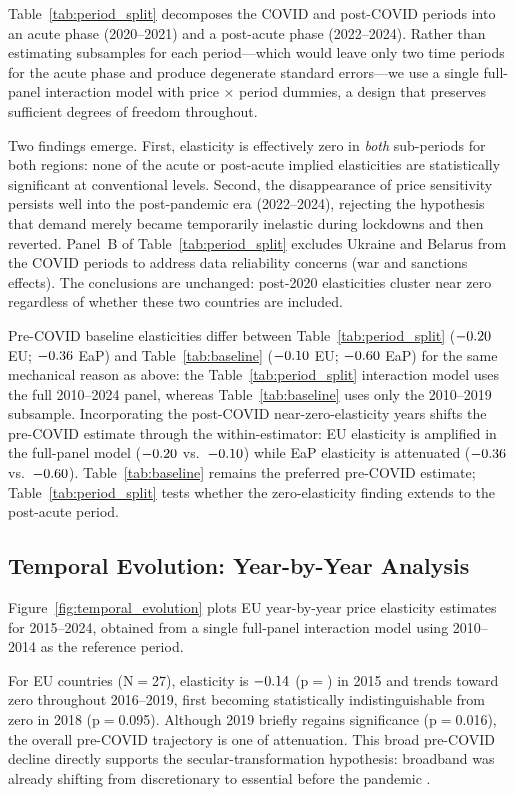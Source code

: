 Table~\ref{tab:period_split} decomposes the COVID and post-COVID periods into an acute phase
(2020--2021) and a post-acute phase (2022--2024). Rather than estimating subsamples for each
period---which would leave only two time periods for the acute phase and produce degenerate
standard errors---we use a single full-panel interaction model with price$\,\times\,$period
dummies, a design that preserves sufficient degrees of freedom throughout.

Two findings emerge. First, elasticity is effectively zero in \emph{both} sub-periods for
both regions: none of the acute or post-acute implied elasticities are statistically
significant at conventional levels. Second, the disappearance of price sensitivity persists
well into the post-pandemic era (2022--2024), rejecting the hypothesis that demand merely
became temporarily inelastic during lockdowns and then reverted. Panel~B of Table~\ref{tab:period_split} excludes Ukraine
and Belarus from the COVID periods to address data reliability concerns (war and sanctions
effects). The conclusions are unchanged: post-2020 elasticities cluster near zero regardless
of whether these two countries are included.

Pre-COVID baseline elasticities differ between Table~\ref{tab:period_split}
($-0.20$ EU; $-0.36$ EaP) and Table~\ref{tab:baseline} ($-0.10$ EU;
$-0.60$ EaP) for the same mechanical reason as above: the Table~\ref{tab:period_split}
interaction model uses the full 2010--2024 panel, whereas Table~\ref{tab:baseline} uses only
the 2010--2019 subsample. Incorporating the post-COVID near-zero-elasticity years shifts the
pre-COVID estimate through the within-estimator: EU elasticity is amplified in the full-panel
model ($-0.20$ vs.\ $-0.10$) while EaP elasticity is attenuated ($-0.36$
vs.\ $-0.60$). Table~\ref{tab:baseline} remains the preferred pre-COVID estimate;
Table~\ref{tab:period_split} tests whether the zero-elasticity finding extends to the
post-acute period.

\subsection{Temporal Evolution: Year-by-Year Analysis}

Figure~\ref{fig:temporal_evolution} plots EU year-by-year price elasticity estimates for
2015--2024, obtained from a single full-panel interaction model using 2010--2014 as the
reference period.

For EU countries (N$=$27), elasticity is $-0.14$ (p$=$\EUYbyYRefPval) in 2015 and
trends toward zero throughout 2016--2019, first becoming statistically indistinguishable
from zero in 2018 (p$=$0.095). Although 2019 briefly regains significance (p$=$0.016), the
overall pre-COVID trajectory is one of attenuation. This broad pre-COVID decline directly
supports the secular-transformation hypothesis: broadband was already shifting from
discretionary to essential before the pandemic \citep{greenstein2016digital}.

